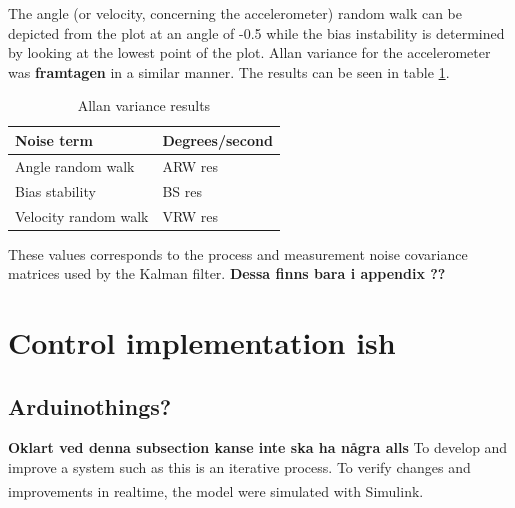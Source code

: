 \documentclass[a4paper,11pt]{kth-mag}
\begin{document}
The angle (or velocity, concerning the accelerometer) random walk can be depicted from the plot at an angle of -0.5 while the bias instability is determined by looking at the lowest point of the plot. Allan variance for the accelerometer was \textbf{framtagen} in a similar manner.  The results can be seen in table \ref{Table: Allan variance}.

\begin{table}[!hbt]
\centering
    \begin{tabular}{| l | l |} \hline
    Noise term & Degrees/second \\ \hline
    Angle random walk & ARW res \\ \hline
    Bias stability & BS res \\ \hline
    Velocity random walk & VRW res \\
    \hline
    \end{tabular}
    \caption{Allan variance results}
    \label{Table: Allan variance}
\end{table}

These values corresponds to the process and measurement noise covariance matrices used by the Kalman filter. \textbf{Dessa finns bara i appendix ??} 

\section{Control implementation ish}
\subsection{Arduinothings?}
\textbf{Oklart ved denna subsection kanse inte ska ha några alls}
To develop and improve a system such as this is an iterative process. To verify changes and improvements in realtime, the model were simulated with Simulink\textsuperscript{\textregistered}. 



\end{document}
